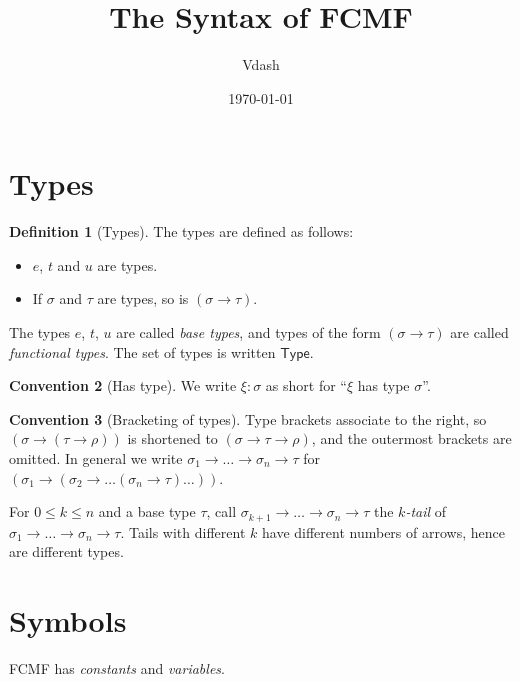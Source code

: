\documentclass[11pt,a4paper]{article}
\title{The Syntax of FCMF}
\author{Vdash}
\date{\today}
\theoremstyle{definition}
\newtheorem{definition}{Definition}[section]
\newtheorem{convention}[definition]{Convention}
\theoremstyle{plain}
\newcommand{\Type}{\mathsf{Type}}
\begin{document}
\maketitle

\section{Types}

\begin{definition}[Types]
The types are defined as follows:
\begin{itemize}[itemsep=0pt]
  \item $e$, $t$ and $u$ are types.
  \item If $\sigma$ and $\tau$ are types, so is $(\sigma\to\tau)$.
\end{itemize}
The types $e$, $t$, $u$ are called \emph{base types}, and types of the form $(\sigma\to\tau)$ are called \emph{functional types}. The set of types is written $\Type$.
\end{definition}

\begin{convention}[Has type]
We write $\xi:\sigma$ as short for ``$\xi$ has type $\sigma$''.
\end{convention}

\begin{convention}[Bracketing of types]
Type brackets associate to the right, so $(\sigma\to(\tau\to\rho))$ is shortened to $(\sigma\to\tau\to\rho)$, and the outermost brackets are omitted. In general we write $\sigma_1\to\dots\to\sigma_n\to\tau$ for $(\sigma_1\to(\sigma_2\to\dots(\sigma_n\to\tau)\dots))$.
\end{convention}

For $0\le k\le n$ and a base type $\tau$, call $\sigma_{k+1}\to\dots\to\sigma_n\to\tau$ the \emph{$k$-tail} of $\sigma_1\to\dots\to\sigma_n\to\tau$. Tails with different $k$ have different numbers of arrows, hence are different types.

\section{Symbols}

FCMF has \emph{constants} and \emph{variables}.
\end{document}
